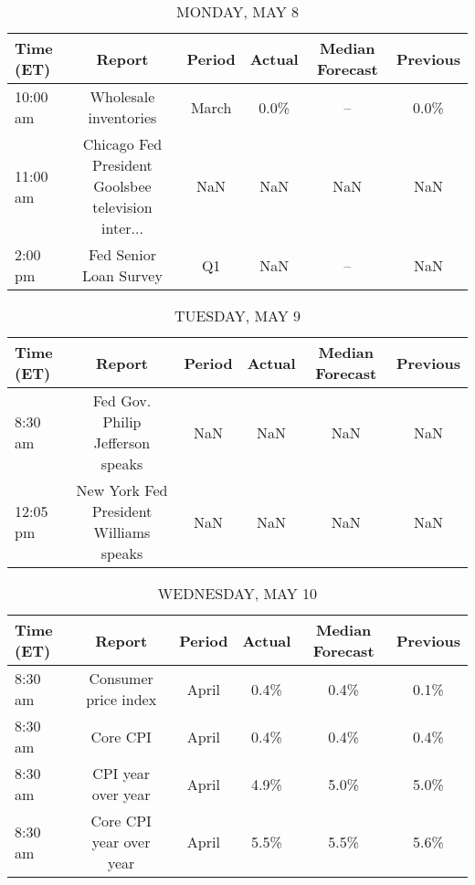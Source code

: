 \documentclass{article}%
\begin{document}
%
\normalsize%


\begin{table}[htbp]%
\caption{MONDAY, MAY 8}%
\centering%
\begin{adjustbox}{width=1\textwidth}%
\begin{tabular}{lccccc}
\toprule
Time (ET) &                                             Report & Period & Actual & Median Forecast & Previous \\
\midrule
 10:00 am &                              Wholesale inventories &  March &   0.0\% &              -- &     0.0\% \\
 11:00 am & Chicago Fed President Goolsbee television inter... &    NaN &    NaN &             NaN &      NaN \\
  2:00 pm &                             Fed Senior Loan Survey &     Q1 &    NaN &              -- &      NaN \\
\bottomrule
\end{tabular}
%
\end{adjustbox}%
\end{table}

%


\begin{table}[htbp]%
\caption{TUESDAY, MAY 9}%
\centering%
\begin{adjustbox}{width=1\textwidth}%
\begin{tabular}{lccccc}
\toprule
Time (ET) &                                 Report & Period & Actual & Median Forecast & Previous \\
\midrule
  8:30 am &       Fed Gov. Philip Jefferson speaks &    NaN &    NaN &             NaN &      NaN \\
 12:05 pm & New York Fed President Williams speaks &    NaN &    NaN &             NaN &      NaN \\
\bottomrule
\end{tabular}
%
\end{adjustbox}%
\end{table}

%


\begin{table}[htbp]%
\caption{WEDNESDAY, MAY 10}%
\centering%
\begin{adjustbox}{width=1\textwidth}%
\begin{tabular}{lccccc}
\toprule
Time (ET) &                  Report & Period & Actual & Median Forecast & Previous \\
\midrule
  8:30 am &    Consumer price index &  April &   0.4\% &            0.4\% &     0.1\% \\
  8:30 am &                Core CPI &  April &   0.4\% &            0.4\% &     0.4\% \\
  8:30 am &      CPI year over year &  April &   4.9\% &            5.0\% &     5.0\% \\
  8:30 am & Core CPI year over year &  April &   5.5\% &            5.5\% &     5.6\% \\
\bottomrule
\end{tabular}
%
\end{adjustbox}%
\end{table}
\end{document}
